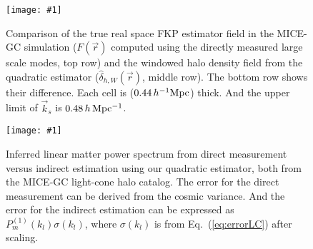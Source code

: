 \documentclass[prd,amsmath,amssymb,floatfix,superscriptaddress,nofootinbib,twocolumn]{revtex4-1}
\newcommand{\ec}[1]{Eq.~(\ref{eq:#1})}
\newcommand{\sfig}[2]{
\texttt{[image: \#1]}
        }
\newcommand{\Sfig}[2]{
   \begin{figure}[thbp]
   \begin{center}
    \sfig{#1.pdf}{\columnwidth}
    \caption{{\small #2}}
    \label{fig:#1}
     \end{center}
   \end{figure}
}
\begin{document}
\Sfig{real_fkp}{Comparison of the true real space FKP estimator field in the MICE-GC simulation ($F(\vec{r})$ computed using the directly measured large scale modes, top row) and the windowed halo density field from the quadratic estimator ($\hat{\delta}_{h,W}(\vec{r})$, middle row). The bottom row shows their difference. Each cell is ($0.44\,h^{-1}\rm Mpc$) thick. And the upper limit of $\vec{k}_s$ is $0.48\,h\,\rm Mpc^{-1}$.}

\Sfig{SN}{Inferred linear matter power spectrum from direct measurement versus indirect estimation using our quadratic estimator, both from the MICE-GC light-cone halo catalog. The error for the direct measurement can be derived from the cosmic variance. And the error for the indirect estimation can be expressed as $P_{m}^{(1)}(k_l)\sigma(k_l)$, where $\sigma(k_l)$ is from \ec{errorLC} after scaling.}
\end{document}
